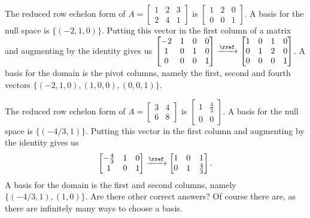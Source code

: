 \begin{example}
The reduced row echelon form of 
$A=
\begin{bmatrix}
 1 & 2 & 3 \\
 2 & 4 & 1
\end{bmatrix}
$
is
$
\begin{bmatrix}
 1 & 2 & 0 \\
 0 & 0 & 1
\end{bmatrix}
$.  A basis for the null space is $\{(-2,1,0)\}$. 
Putting this vector in the first column of a matrix and augmenting by the identity gives us 
$
\begin{bmatrix}
 -2 & 1 & 0 & 0 \\
 1 & 0 & 1 & 0 \\
 0 & 0 & 0 & 1\end{bmatrix}
\xrightarrow{\rref}
\begin{bmatrix}
 1 & 0 & 1 & 0 \\
 0 & 1 & 2 & 0 \\
 0 & 0 & 0 & 1
\end{bmatrix}
$.
A basis for the domain is the pivot columns, namely the first, second and fourth vectors $\{(-2,1,0),(1,0,0), (0,0,1)\}$. 

\end{example}


\begin{example}
The reduced row echelon form of 
$A=
\begin{bmatrix}
 3 & 4 \\
 6 & 8
\end{bmatrix}
$
is
$
\begin{bmatrix}
 1 & \frac{4}{3} \\
 0 & 0
\end{bmatrix}
$.  A basis for the null space is $\{(-4/3,1)\}$. Putting this vector in the first column and augmenting by the identity gives us 
$$
\begin{bmatrix}
 -\frac{4}{3} & 1 & 0 \\
 1 & 0 & 1
\end{bmatrix}
\xrightarrow{\rref}
\begin{bmatrix}
 1 & 0 & 1 \\
 0 & 1 & \frac{4}{3}
\end{bmatrix}
.$$
A basis for the domain is the first and second columns, namely $\{(-4/3,1),(1,0)\}$. Are there other correct answers? Of course there are, as there are infinitely many ways to choose a basis.

\end{example}

